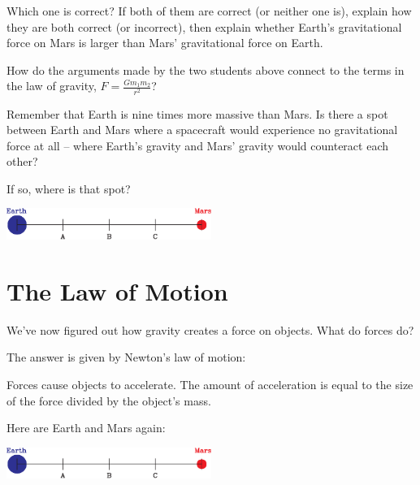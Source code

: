 \documentclass[12pt]{article}
\begin{document}
\newpage

Which one is correct? If both of them are correct (or neither one is), explain how they are both correct (or incorrect), then explain whether Earth's gravitational force on Mars is larger than Mars' gravitational force on Earth.

\vspace{2in}

How do the arguments made by the two students above connect to the terms in the law of gravity, $F = \frac{Gm_1m_2}{r^2}$?

\vspace{1.5in}

Remember that Earth is nine times more massive than Mars. Is there a spot between Earth and Mars where a spacecraft would experience no gravitational force at all -- where Earth's gravity and Mars' gravity would counteract each other?

If so, where is that spot?

\begin{center}
	\includegraphics[width=0.5\textwidth]{earth-mars-crop.pdf}
\end{center}

\newpage

\section{The Law of Motion}

We've now figured out how gravity creates a force on objects. What do forces do?

The answer is given by Newton's law of motion:
	\begin{center}
	
	
	\begin{minipage}{0.9\textwidth}
		
		Forces cause objects to accelerate. The amount of acceleration is equal to the size of the force divided by the object's mass.
		
	\end{minipage}
\end{center}

Here are Earth and Mars again:

\begin{center}
	\includegraphics[width=0.5\textwidth]{earth-mars-crop.pdf}
\end{center}
\end{document}

